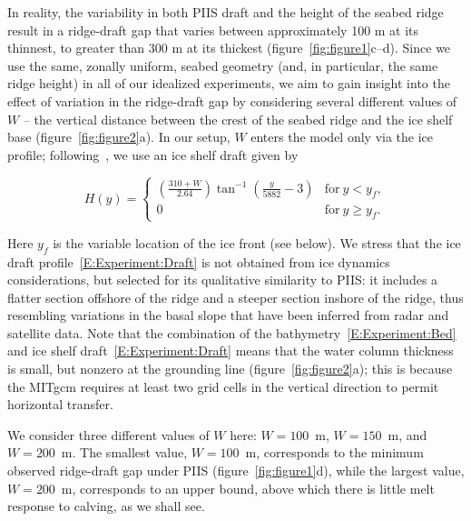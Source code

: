 \documentclass[draft]{agujournal2019}
\begin{document}
In reality, the variability in both PIIS draft and the height of the seabed ridge result in a ridge-draft gap that varies between approximately 100 m at its thinnest, to greater than 300 m at its thickest (figure~\ref{fig:figure1}c--d). Since we use the same, zonally uniform, seabed geometry (and, in particular, the same ridge height) in all of our idealized experiments, we aim to gain insight into the effect of variation in the ridge-draft gap by considering several different values of $W$ -- the vertical distance between the crest of the seabed ridge and the ice shelf base (figure~\ref{fig:figure2}a). In our setup, $W$ enters the model only via the ice profile; following~, we use an ice shelf draft given by
\begin{linenomath*}
\begin{equation}\label{E:Experiment:Draft}
    H(y) = \begin{cases}
    \left(\frac{310 + W}{2.64}\right)\tan^{-1}\left(\frac{y}{5882} -3\right) & \text{for}~y < y_f,\\
    0  & \text{for}~y \geq y_f.
    \end{cases}
\end{equation}
\end{linenomath*}
Here $y_f$ is the variable location of the ice front (see below). We stress that the ice draft profile~\eqref{E:Experiment:Draft} is not obtained from ice dynamics considerations, but selected for its qualitative similarity to PIIS: it includes a flatter section offshore of the ridge and a steeper section inshore of the ridge, thus resembling variations in the basal slope that have been inferred from radar and satellite data. Note that the combination of the bathymetry~\eqref{E:Experiment:Bed} and ice shelf draft~\eqref{E:Experiment:Draft} means that the water column thickness is small, but nonzero at the grounding line (figure~\ref{fig:figure2}a); this is because the MITgcm requires at least two grid cells in the vertical direction to permit horizontal transfer.

We consider three different values of $W$ here: $W=100$~m, $W=150$~m, and $W=200$~m. The smallest value, $W=100$~m, corresponds to the minimum observed ridge-draft gap under PIIS (figure~\ref{fig:figure1}d), while the largest value, $W=200$~m, corresponds to an upper bound, above which there is little melt response to calving, as we shall see.
\end{document}
